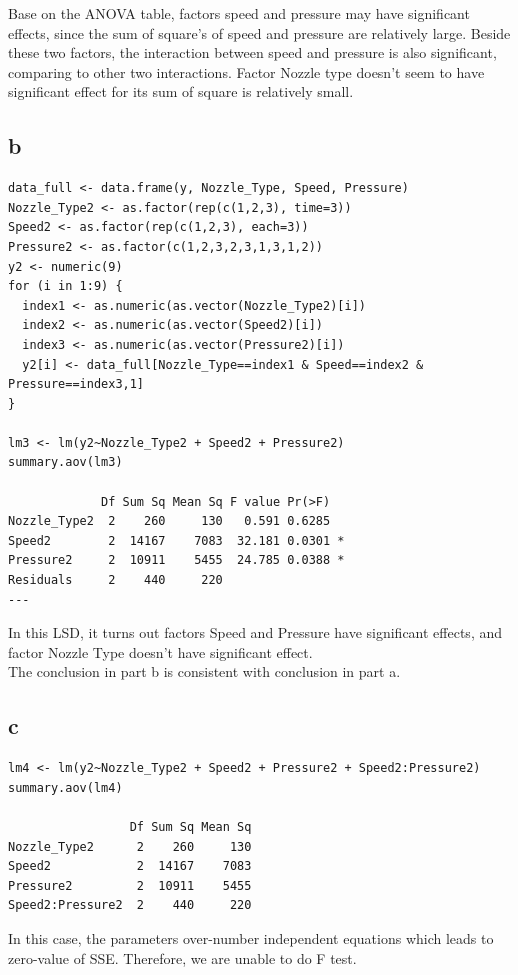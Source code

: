 \documentclass[11pt,letterpaper]{article}
\begin{document}
\noindent Base on the ANOVA table, factors speed and pressure may have significant effects, since the sum of square's of speed and pressure are relatively large. Beside these two factors, the interaction between speed and pressure is also significant, comparing to other two interactions. Factor Nozzle type doesn't seem to have significant effect for its sum of square is relatively small. 

\subsection*{b}
\begin{verbatim}
data_full <- data.frame(y, Nozzle_Type, Speed, Pressure)
Nozzle_Type2 <- as.factor(rep(c(1,2,3), time=3))
Speed2 <- as.factor(rep(c(1,2,3), each=3))
Pressure2 <- as.factor(c(1,2,3,2,3,1,3,1,2))
y2 <- numeric(9)
for (i in 1:9) {
  index1 <- as.numeric(as.vector(Nozzle_Type2)[i])
  index2 <- as.numeric(as.vector(Speed2)[i])
  index3 <- as.numeric(as.vector(Pressure2)[i])
  y2[i] <- data_full[Nozzle_Type==index1 & Speed==index2 & Pressure==index3,1]
}

lm3 <- lm(y2~Nozzle_Type2 + Speed2 + Pressure2)
summary.aov(lm3)

             Df Sum Sq Mean Sq F value Pr(>F)  
Nozzle_Type2  2    260     130   0.591 0.6285  
Speed2        2  14167    7083  32.181 0.0301 *
Pressure2     2  10911    5455  24.785 0.0388 *
Residuals     2    440     220                 
---
\end{verbatim}

\noindent In this LSD, it turns out factors Speed and Pressure have significant effects, and factor Nozzle Type doesn't have significant effect. \\

\noindent The conclusion in part b is consistent with conclusion in part a.

\subsection*{c}
\begin{verbatim}
lm4 <- lm(y2~Nozzle_Type2 + Speed2 + Pressure2 + Speed2:Pressure2)
summary.aov(lm4)

                 Df Sum Sq Mean Sq
Nozzle_Type2      2    260     130
Speed2            2  14167    7083
Pressure2         2  10911    5455
Speed2:Pressure2  2    440     220
\end{verbatim}

\noindent In this case, the parameters over-number independent equations which leads to zero-value of SSE. Therefore, we are unable to do F test. 
\end{document}
